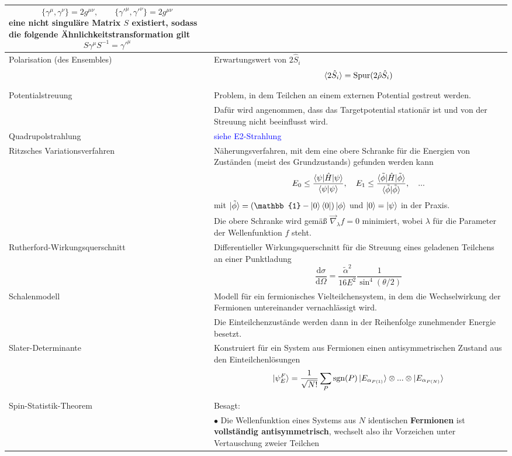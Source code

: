 \documentclass{article}
\newcommand{\diff}{\mathrm{d}}
\begin{document}
\begin{xltabular}{\linewidth}{p{6cm}|X}
		$$\{\gamma^\mu, \gamma^\nu\} = 2g^{\mu\nu},\qquad \{\gamma'^\mu, \gamma'^\nu\} = 2g^{\mu\nu}$$
		eine nicht singuläre Matrix $S$ existiert, sodass die folgende Ähnlichkeitstransformation gilt
			$$S \gamma^\mu S^{-1} = \gamma'^\mu$$ \\
	\hline
		Polarisation (des Ensembles) & Erwartungswert von $2\hat{S}_i$
			$$\braket{2\hat{S}_i} = \text{Spur}(2\hat{\rho}\hat{S}_i)$$ \\
	\hline
		Potentialstreuung & Problem, in dem Teilchen an einem externen Potential gestreut werden.\\
		& Dafür wird angenommen, dass das Targetpotential stationär ist und von der Streuung nicht beeinflusst wird. \\
	\hline
		Quadrupolstrahlung & \textcolor{blue}{siehe E2-Strahlung} \\
	\hline
		Ritzsches Variationsverfahren & Näherungsverfahren, mit dem eine obere Schranke für die Energien von Zuständen (meist des Grundzustands) gefunden werden kann
			$$E_0 \leq \frac{\braket{\psi | \hat{H} | \psi}}{\braket{\psi | \psi}},\quad E_1 \leq \frac{\braket{\tilde{\phi} | \hat{H} | \tilde{\phi}}}{\braket{\tilde{\phi} | \tilde{\phi}}}, \quad ...$$  
		mit $\ket{\tilde{\phi}} = (\mathbb{1} - \ket{0}\bra{0}) \ket{\phi}$ und $\ket{0} = \ket{\psi}$ in der Praxis. \\
		& Die obere Schranke wird gemäß $\vec{\nabla}_\lambda f = 0$ minimiert, wobei $\lambda$ für die Parameter der Wellenfunktion $f$ steht. \\
	\hline
		Rutherford-Wirkungsquerschnitt & Differentieller Wirkungsquerschnitt für die Streuung eines geladenen Teilchens an einer Punktladung
			$$\frac{\diff\sigma}{\diff\Omega} = \frac{\tilde{\alpha}^2}{16 E^2} \frac{1}{\sin^4(\theta/2)}$$ \\
	\hline
		Schalenmodell & Modell für ein fermionisches Vielteilchensystem, in dem die Wechselwirkung der Fermionen untereinander vernachlässigt wird.\\
		& Die Einteilchenzustände werden dann in der Reihenfolge zunehmender Energie besetzt. \\
	\hline
		Slater-Determinante & Konstruiert für ein System aus Fermionen einen antisymmetrischen Zustand aus den Einteilchenlösungen 
			$$\ket{\psi_E^F} = \frac{1}{\sqrt{N!}} \sum_P \text{sgn}(P) \ket{E_{\alpha_{P(1)}}} \otimes ...\otimes \ket{E_{\alpha_{P(N)}}}$$ \\
	\hline
		Spin-Statistik-Theorem & Besagt: \\
		& $\bullet$ Die Wellenfunktion eines Systems aus $N$ identischen \textbf{Fermionen} ist \textbf{vollständig antisymmetrisch}, wechselt also ihr Vorzeichen unter Vertauschung zweier Teilchen

\end{xltabular}
\end{document}
